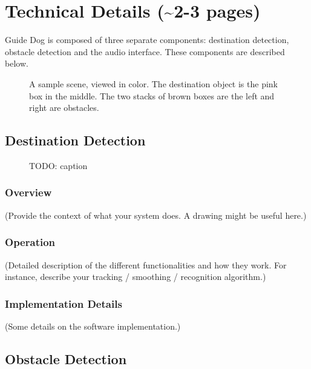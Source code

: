 \section{Technical Details (\textasciitilde 2-3 pages)}
\label{sec:technical}

Guide Dog is composed of three separate components: destination detection,
obstacle detection and the audio interface. These components are described
below.

\begin{figure}
\caption{A sample scene, viewed in color. The destination object is the pink box
  in the middle. The two stacks of brown boxes are the left and right are
  obstacles.}
\label{fig:color}
\end{figure}

\subsection{Destination Detection}
\label{sec:dest}

\begin{figure}
\caption{TODO: caption}
\label{fig:destination}
\end{figure}

\subsubsection{Overview}
\label{sec:dest-overview}

(Provide the context of what your system does. A drawing might be useful here.)

\subsubsection{Operation}
\label{sec:dest-op}

(Detailed description of the different functionalities and how they work. For
instance, describe your tracking / smoothing / recognition algorithm.)

\subsubsection{Implementation Details}
\label{sec:dest-impl}

(Some details on the software implementation.)

\subsection{Obstacle Detection}
\label{sec:obs}

